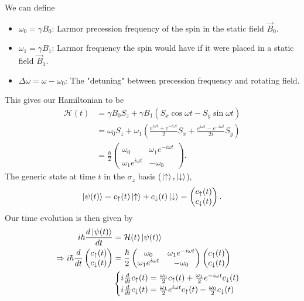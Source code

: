 \documentclass{article}
\begin{document}
We can define
\begin{itemize}
    \item $\omega _0=\gamma B_0$: Larmor precession frequency of the spin in the static field $\vec{B}_0$.
    \item $\omega _1=\gamma B_1$: Larmor frequency the spin would have if it were placed in a static field $\vec{B}_1$.
    \item $\Delta \omega =\omega -\omega _0$: The "detuning" between precession frequency and rotating field.
\end{itemize}
This gives our Hamiltonian to be
\begin{align*}
    \mathcal{H}(t) &= \gamma B_0S_z+\gamma B_1(S_x\cos\omega t-S_y\sin\omega t) \\
                   &= \omega _0S_z+\omega _1 \left( \frac{e^{i\omega t}+e^{-i\omega t}}{2}S_x+\frac{e^{i\omega t}-e^{-i\omega t}}{2i}S_y \right) \\
                   &= \frac{\hbar}{2}\begin{pmatrix}
                       \omega _0 & \omega _1e^{-i\omega t} \\
                       \omega _1e^{i\omega t} & -\omega _0
                   \end{pmatrix}.
\end{align*}
The generic state at time $t$ in the $\sigma _z$ basis ($\ket{\uparrow},\ket{\downarrow}$),
\[
    \ket{\psi (t)}=c_{\uparrow}(t)\ket{\uparrow}+c_{\downarrow}(t)\ket{\downarrow}=\begin{pmatrix}
        c_{\uparrow}(t) \\
        c_{\downarrow}(t)
    \end{pmatrix}.
\]
Our time evolution is then given by
\begin{align*}
    i \hbar \frac{d \ket{\psi (t)}}{d t} &= \mathcal{H}(t)\ket{\psi (t)} \\
    \Rightarrow i \hbar \frac{d }{d t}\begin{pmatrix}
        c_{\uparrow}(t) \\
        c_{\downarrow}(t)
    \end{pmatrix} &= \frac{\hbar}{2}\begin{pmatrix}
    \omega _0 & \omega _1e^{-i\omega t} \\
    \omega _1e^{i\omega t} & -\omega _0
    \end{pmatrix}\begin{pmatrix}
        c_{\uparrow}(t) \\
        c_{\downarrow}(t)
    \end{pmatrix}\\
                                         & \begin{cases}
                                             i \frac{d }{d t}c_{\uparrow}(t)=\frac{\omega _0}{2}c_{\uparrow}(t)+\frac{\omega _1}{2}e^{-i\omega t}c_{\downarrow}(t) \\
                                            i \frac{d }{d t}c_{\downarrow}(t)=\frac{\omega _1}{2}e^{i\omega t}c_{\uparrow}(t)-\frac{\omega _0}{2}c_{\downarrow}(t)
                                         \end{cases}
\end{align*}
\end{document}
